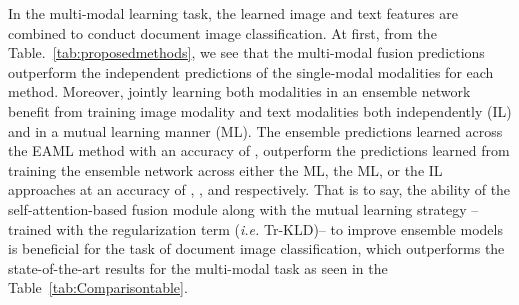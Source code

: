 \documentclass[twocolumn]{svjour3}
\newcommand{\ie}{\textit{i.e. }}
\begin{document}
In the multi-modal learning task, the learned image and text features are combined to conduct document image classification. At first, from the Table.~\ref{tab:proposedmethods}, we see that the multi-modal fusion predictions outperform the independent predictions of the single-modal modalities for each method. 
Moreover, jointly learning both modalities in an ensemble network benefit from training image modality and text modalities both independently (IL) and in a mutual learning manner (ML). The ensemble predictions learned across the EAML method with an accuracy of , outperform the predictions learned from training the ensemble network across either the ML, the ML, or the IL approaches at an accuracy of , , and  respectively. That is to say, the ability of the self-attention-based fusion module along with the mutual learning strategy --trained with the regularization term (\ie Tr-KLD)-- to improve ensemble models is beneficial for the task of document image classification, which outperforms the state-of-the-art results for the multi-modal task as seen in the Table~\ref{tab:Comparisontable}. 
\setlength\tabcolsep{7 pt}
\end{document}
